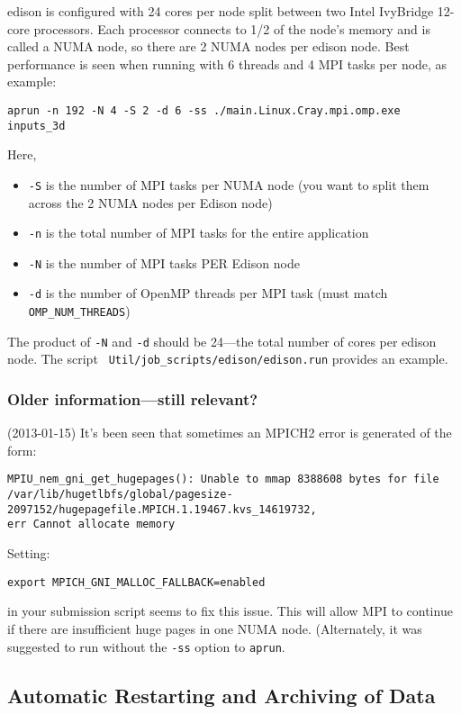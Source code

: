 edison is configured with 24 cores per node split between two Intel IvyBridge
12-core processors.  Each processor connects to 1/2 of the node's memory
and is called a NUMA node, so there are 2 NUMA nodes per edison node.
Best performance is seen when
running with 6 threads and 4 MPI tasks per node, as example:
\begin{verbatim}
aprun -n 192 -N 4 -S 2 -d 6 -ss ./main.Linux.Cray.mpi.omp.exe inputs_3d
\end{verbatim}
Here,
\begin{itemize}
\item {\tt -S} is the number of MPI tasks per NUMA node (you want to split them
  across the 2 NUMA nodes per Edison node)
\item {\tt -n} is the total number of MPI tasks for the entire application
\item {\tt -N} is the number of MPI tasks PER Edison node
\item {\tt -d} is the number of OpenMP threads per MPI task (must match 
{\tt OMP\_NUM\_THREADS})
\end{itemize}
The product of {\tt -N} and {\tt -d} should be 24---the total number of cores
per edison node.
The script {\tt
Util/job\_scripts/edison/edison.run} provides an example.

\subsubsection{Older information---still relevant?}
\noindent (2013-01-15) It's been seen that sometimes an MPICH2 error is 
generated of the form:
\begin{verbatim}
MPIU_nem_gni_get_hugepages(): Unable to mmap 8388608 bytes for file 
/var/lib/hugetlbfs/global/pagesize-2097152/hugepagefile.MPICH.1.19467.kvs_14619732, 
err Cannot allocate memory
\end{verbatim}
Setting:
\begin{verbatim}
export MPICH_GNI_MALLOC_FALLBACK=enabled
\end{verbatim}
in your submission script seems to fix this issue.  This will allow
MPI to continue if there are insufficient huge pages in one NUMA node.
(Alternately, it was suggested to run without the {\tt -ss} option to
{\tt aprun}.

\subsection{Automatic Restarting and Archiving of Data}

